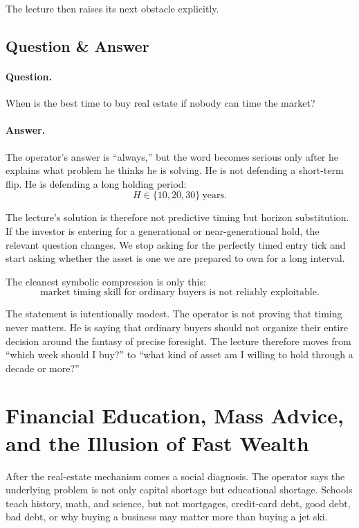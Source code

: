 The lecture then raises its next obstacle explicitly.

\subsection{Question \& Answer}

\paragraph{Question.}
When is the best time to buy real estate if nobody can time the market?

\paragraph{Answer.}
The operator's answer is ``always,'' but the word becomes serious only after he explains what problem he thinks he is solving. He is not defending a short-term flip. He is defending a long holding period:
\begin{equation}
H \in \{10,20,30\}\ \text{years}.
\end{equation}

The lecture's solution is therefore not predictive timing but horizon substitution. If the investor is entering for a generational or near-generational hold, the relevant question changes. We stop asking for the perfectly timed entry tick and start asking whether the asset is one we are prepared to own for a long interval.

The cleanest symbolic compression is only this:
\begin{equation}
\text{market timing skill for ordinary buyers is not reliably exploitable}.
\end{equation}

The statement is intentionally modest. The operator is not proving that timing never matters. He is saying that ordinary buyers should not organize their entire decision around the fantasy of precise foresight. The lecture therefore moves from ``which week should I buy?'' to ``what kind of asset am I willing to hold through a decade or more?''

\section{Financial Education, Mass Advice, and the Illusion of Fast Wealth}

After the real-estate mechanism comes a social diagnosis. The operator says the underlying problem is not only capital shortage but educational shortage. Schools teach history, math, and science, but not mortgages, credit-card debt, good debt, bad debt, or why buying a business may matter more than buying a jet ski.


